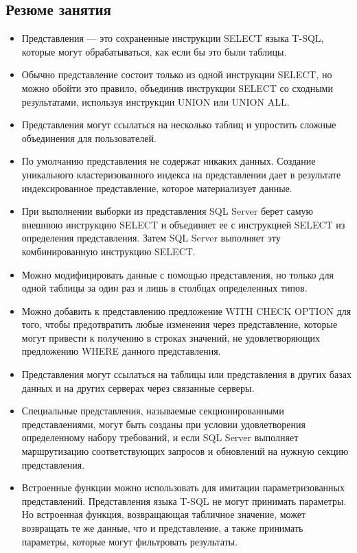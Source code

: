 \subsection*{Резюме занятия}
\begin{itemize}
\item Представления — это сохраненные инструкции SELECT языка T-SQL, которые
могут обрабатываться, как если бы это были таблицы. 
\item Обычно представление состоит только из одной инструкции SELECT, но можно
обойти это правило, объединив инструкции SELECT со сходными результатами,
используя инструкции UNION или UNION ALL. 
\item Представления могут ссылаться на несколько таблиц и упростить сложные объединения для пользователей. 
\item По умолчанию представления не содержат никаких данных. Создание уникального кластеризованного индекса на представлении дает в результате индексированное представление, которое материализует данные. 
\item При выполнении выборки из представления SQL Server берет самую внешнюю
инструкцию SELECT и объединяет ее с инструкцией SELECT из определения представления. Затем SQL Server выполняет эту комбинированную инструкцию
SELECT. 
\item Можно модифицировать данные с помощью представления, но только для одной таблицы за один раз и лишь в столбцах определенных типов. 
\item Можно добавить к представлению предложение WITH CHECK OPTION для того,
чтобы предотвратить любые изменения через представление, которые могут
привести к получению в строках значений, не удовлетворяющих предложению
WHERE данного представления. 
\item Представления могут ссылаться на таблицы или представления в других базах
данных и на других серверах через связанные серверы.
\item Специальные представления, называемые секционированными представлениями, могут быть созданы при условии удовлетворения определенному набору
требований, и если SQL Server выполняет маршрутизацию соответствующих запросов и обновлений на нужную секцию представления. 
\item Встроенные функции можно использовать для имитации параметризованных
представлений. Представления языка T-SQL не могут принимать параметры. Но
встроенная функция, возвращающая табличное значение, может возвращать те
же данные, что и представление, а также принимать параметры, которые могут
фильтровать результаты. 
\end{itemize}


